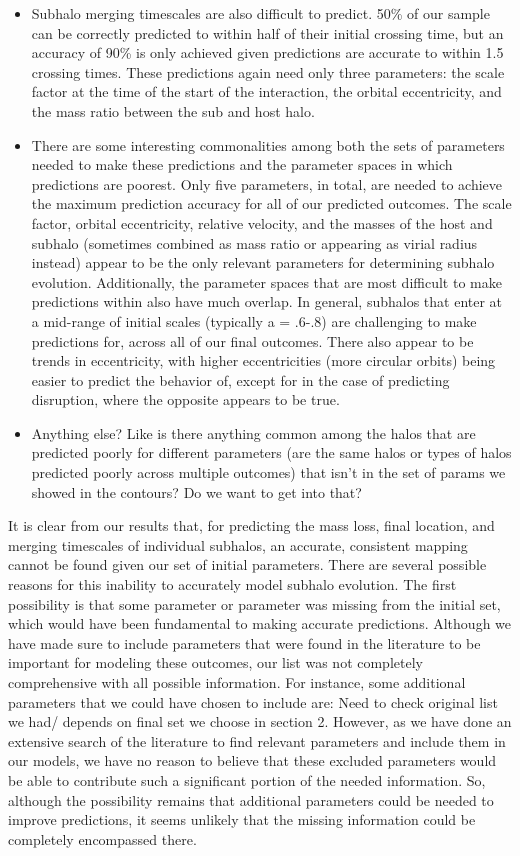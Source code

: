\documentclass[fleqn,usenatbib]{mnras}
\newcommand\edits[1]{{\color{red}#1}}
\begin{document}
{\begin{itemize}
    \item Subhalo merging timescales are also difficult to predict. 50\% of our sample can be correctly predicted to within half of their initial crossing time, but an accuracy of 90\% is only achieved given predictions are accurate to within 1.5 crossing times. These predictions again need only three parameters: the scale factor at the time of the start of the interaction, the orbital eccentricity, and the mass ratio between the sub and host halo. 
    \item There are some interesting commonalities among both the sets of parameters needed to make these predictions and the parameter spaces in which predictions are poorest. Only five parameters, in total, are needed to achieve the maximum prediction accuracy for all of our predicted outcomes. The scale factor, orbital eccentricity, relative velocity, and the masses of the host and subhalo (sometimes combined as mass ratio or appearing as virial radius instead) appear to be the only relevant parameters for determining subhalo evolution. Additionally, the parameter spaces that are most difficult to make predictions within also have much overlap. In general, subhalos that enter at a mid-range of initial scales (typically a = .6-.8) are challenging to make predictions for, across all of our final outcomes. There also appear to be trends in eccentricity, with higher eccentricities (more circular orbits) being easier to predict the behavior of, except for in the case of predicting disruption, where the opposite appears to be true.
    \item \edits{Anything else? Like is there anything common among the halos that are predicted poorly for different parameters (are the same halos or types of halos predicted poorly across multiple outcomes) that isn't in the set of params we showed in the contours? Do we want to get into that?}
\end{itemize}

It is clear from our results that, for predicting the mass loss, final location, and merging timescales of individual subhalos, an accurate, consistent mapping cannot be found given our set of initial parameters. There are several possible reasons for this inability to accurately model subhalo evolution. The first possibility is that some parameter or parameter was missing from the initial set, which would have been fundamental to making accurate predictions. Although we have made sure to include parameters that were found in the literature to be important for modeling these outcomes, our list was not completely comprehensive with all possible information. For instance, some additional parameters that we could have chosen to include are: \edits{Need to check original list we had/ depends on final set we choose in section 2}. However, as we have done an extensive search of the literature to find relevant parameters and include them in our models, we have no reason to believe that these excluded parameters would be able to contribute such a significant portion of the needed information. So, although the possibility remains that additional parameters could be needed to improve predictions, it seems unlikely that the missing information could be completely encompassed there.

}
\end{document}
